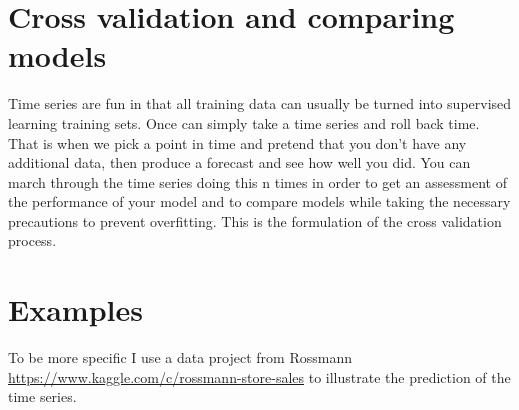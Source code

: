 \documentclass[11pt,fleqn]{book} %
\begin{document}
 

\section{Cross validation and comparing models}

Time series are fun in that all training data can usually be turned into supervised learning training sets. Once can simply take a time series and roll back time. That is when we pick a point in time and pretend that you don't have any additional data, then produce a forecast and see how well you did. You can march through the time series doing this n times in order to get an assessment of the performance of your model and to compare models while taking the necessary precautions to prevent overfitting. This is the formulation of the cross validation process.

\section{Examples}
To be more specific I use a data project from Rossmann \url{https://www.kaggle.com/c/rossmann-store-sales} to illustrate the prediction of the time series.
\end{document}
